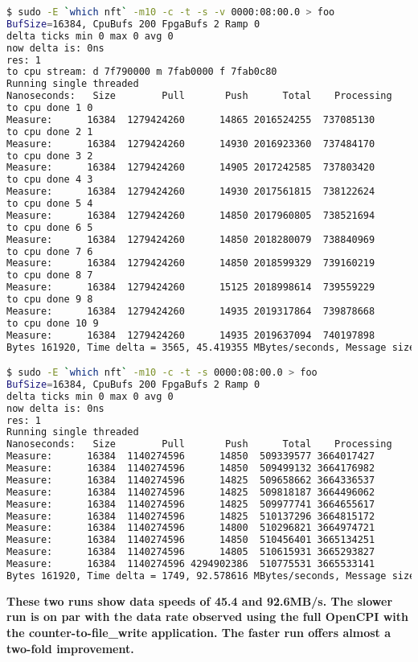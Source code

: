 \begin{lstlisting}[language=bash]
$ sudo -E `which nft` -m10 -c -t -s -v 0000:08:00.0 > foo
BufSize=16384, CpuBufs 200 FpgaBufs 2 Ramp 0
delta ticks min 0 max 0 avg 0
now delta is: 0ns
res: 1
to cpu stream: d 7f790000 m 7fab0000 f 7fab0c80
Running single threaded
Nanoseconds:   Size        Pull       Push      Total    Processing
to cpu done 1 0
Measure:      16384  1279424260      14865 2016524255  737085130
to cpu done 2 1
Measure:      16384  1279424260      14930 2016923360  737484170
to cpu done 3 2
Measure:      16384  1279424260      14905 2017242585  737803420
to cpu done 4 3
Measure:      16384  1279424260      14930 2017561815  738122624
to cpu done 5 4
Measure:      16384  1279424260      14850 2017960805  738521694
to cpu done 6 5
Measure:      16384  1279424260      14850 2018280079  738840969
to cpu done 7 6
Measure:      16384  1279424260      14850 2018599329  739160219
to cpu done 8 7
Measure:      16384  1279424260      15125 2018998614  739559229
to cpu done 9 8
Measure:      16384  1279424260      14935 2019317864  739878668
to cpu done 10 9
Measure:      16384  1279424260      14935 2019637094  740197898
Bytes 161920, Time delta = 3565, 45.419355 MBytes/seconds, Message size 16384

$ sudo -E `which nft` -m10 -c -t -s 0000:08:00.0 > foo
BufSize=16384, CpuBufs 200 FpgaBufs 2 Ramp 0
delta ticks min 0 max 0 avg 0
now delta is: 0ns
res: 1
Running single threaded
Nanoseconds:   Size        Pull       Push      Total    Processing
Measure:      16384  1140274596      14850  509339577 3664017427
Measure:      16384  1140274596      14850  509499132 3664176982
Measure:      16384  1140274596      14825  509658662 3664336537
Measure:      16384  1140274596      14825  509818187 3664496062
Measure:      16384  1140274596      14825  509977741 3664655617
Measure:      16384  1140274596      14825  510137296 3664815172
Measure:      16384  1140274596      14800  510296821 3664974721
Measure:      16384  1140274596      14850  510456401 3665134251
Measure:      16384  1140274596      14805  510615931 3665293827
Measure:      16384  1140274596 4294902386  510775531 3665533141
Bytes 161920, Time delta = 1749, 92.578616 MBytes/seconds, Message size 16384
\end{lstlisting}

\textbf{These two runs show data speeds of 45.4 and 92.6MB/s.  The slower run is on par with the data rate observed using the full OpenCPI with the counter-to-file\_write application.  The faster run offers almost a two-fold improvement.}


